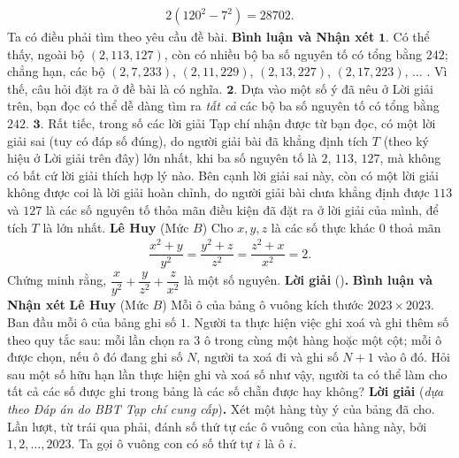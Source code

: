\begin{multicols}{2}
	\begin{align*}
		2\left( {{{120}^2} - {7^2}} \right) = 28702.
	\end{align*}
	Ta có điều phải tìm theo yêu cầu đề bài.
	\vskip 0.05cm
	\textbf{\color{thachthuctoanhoc}Bình luận và Nhận xét}
	\vskip 0.05cm	
	$\pmb{1.}$ Có thể thấy, ngoài bộ $(2, 113, 127)$, còn có nhiều bộ ba số nguyên tố có tổng bằng $242$; chẳng hạn, các bộ $(2, 7, 233)$, $(2, 11, 229)$, $(2, 13, 227)$, $(2, 17, 223)$, $\ldots$ . Vì thế, câu hỏi đặt ra ở đề bài là có nghĩa.
	\vskip 0.05cm
	$\pmb{2.}$ Dựa vào một số ý đã nêu ở Lời giải trên, bạn đọc có thể dễ dàng tìm ra \textit{tất cả} các bộ ba số nguyên tố có tổng bằng $242$.
	\vskip 0.05cm
	$\pmb{3.}$ Rất tiếc, trong số các lời giải Tạp chí nhận được từ bạn đọc, có một lời giải sai (tuy có đáp số đúng), do người giải bài đã khẳng định tích $T$ (theo ký hiệu ở Lời giải trên đây) lớn nhất, khi ba số nguyên tố là $2$, $113$, $127$, mà không có bất cứ lời giải thích hợp lý nào. Bên cạnh lời giải sai này, còn có một lời giải không được coi là lời giải hoàn chỉnh, do người giải bài chưa khẳng định được $113$ và $127$ là các số nguyên tố thỏa mãn điều kiện đã đặt ra ở lời giải của mình, để tích $T$ là lớn nhất.
	\vskip 0.05cm
	\hfill \textbf{\color{thachthuctoanhoc}Lê Huy}
	\vskip 0.05cm
	{}
	(Mức $B$) Cho $x,y,z$ là các số thực khác $0$ thoả mãn 
	\begin{align*}
		\dfrac{x^2+y}{y^2}=\dfrac{y^2+z}{z^2}=\dfrac{z^2+x}{x^2}=2.
	\end{align*}
	Chứng minh rằng, $\dfrac x{y^2}+\dfrac y{z^2}+\dfrac z{x^2}$ là một số nguyên.
	\vskip 0.05cm
	\textbf{\color{thachthuctoanhoc}Lời giải} ()\textbf{\color{thachthuctoanhoc}.}
	\vskip 0.05cm
	\textbf{\color{thachthuctoanhoc}Bình luận và Nhận xét}
	\vskip 0.05cm
	\hfill\textbf{\color{thachthuctoanhoc}Lê Huy}
	\vskip 0.05cm
	{}
	(Mức $B$) Mỗi ô của bảng ô vuông kích thước $2023\times2023$. Ban đầu mỗi ô của bảng ghi số $1$. Người ta thực hiện việc ghi xoá và ghi thêm số theo quy tắc sau: mỗi lần chọn ra $3$ ô trong cùng một hàng hoặc một cột; mỗi ô được chọn, nếu ô đó đang ghi số $N$, người ta xoá đi và ghi số $N+1$ vào ô đó. 
	\vskip 0.05cm
	Hỏi sau một số hữu hạn lần thực hiện ghi và xoá số như vậy, người ta có thể làm cho tất cả các số được ghi trong bảng là các số chẵn được hay không?
	\vskip 0.1cm
	\textbf{\color{thachthuctoanhoc}Lời giải} (\textit{dựa theo Đáp án do BBT Tạp chí cung cấp})\textbf{\color{thachthuctoanhoc}.}
	\vskip 0.05cm
	Xét một hàng tùy ý của bảng đã cho. Lần lượt, từ trái qua phải, đánh số thứ tự các ô vuông con của hàng này, bởi $1, 2, \ldots, 2023$. Ta gọi ô vuông con có số thứ tự $i$ là ô $i$.

\end{multicols}
